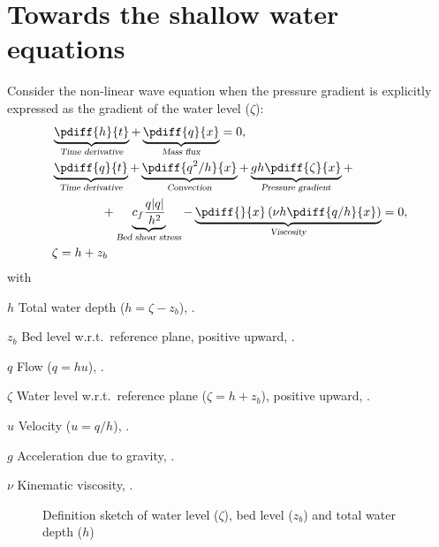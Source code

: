 \chapter{Towards the shallow water equations}\label{sec:1d_swe}
Consider the non-linear wave equation when the pressure gradient is explicitly expressed as the gradient of the water level ($\zeta$):
\begin{subequations}
    \begin{align}
        &\underbrace{\pdiff{h}{t}}_{\textsl{Time derivative}}  +
        \underbrace{\pdiff{q}{x}}_{\textsl{Mass flux}} =0,
        \\
        &\underbrace{\pdiff{q}{t}}_{\textsl{Time derivative}}  +
        \underbrace{\pdiff{q^2/h}{x}}_{\textsl{Convection}} +
        \underbrace{gh \pdiff{\zeta}{x}}_{\textsl{Pressure gradient}} +
        \nonumber \\*
        & \qquad \qquad +
        \underbrace{c_f\frac{q\abs{q}}{h^2}}_{\textsl{Bed shear stress}}
        -\underbrace{\pdiff{}{x}\left( \nu h \pdiff{q/h}{x}\right)}_{\textsl{Viscosity}} = 0,
        \\
        &\zeta = h + z_b
    \end{align}
    \label{eq:1d_non_linear_wave2}
\end{subequations}
%
with
\begin{symbollist}
    \item[$h$] Total water depth ($h = \zeta - z_b$), \bunit{\metre}.
    \item[$z_b$] Bed level w.r.t.\ reference plane, positive upward, \bunit{\metre}.
    \item[$q$] Flow ($q = hu$), \bunit{\square\metre\per\second}.
    \item[$\zeta$] Water level w.r.t.\ reference plane ($\zeta = h + z_b$), positive upward, \bunit{\metre}.
    \item[$u$] Velocity ($u = q/h$), \bunit{\metre\per\second}.
    \item[$g$] Acceleration due to gravity, \bunit{\metre\per\square\second}.
    \item[$\nu$] Kinematic viscosity, \bunit{\square\metre\per\second}.
\end{symbollist}
\vspace{1cm}
\begin{figure}[H]
    \centering
    \begin{center}
        \def\svgwidth{1.0\textwidth} %
        \resizebox{0.9\textwidth}{!}{
            
        }
    \end{center}
    \caption{Definition sketch of water level ($\zeta$), bed level ($z_b$) and total water depth ($h$)}\label{fig:definition_variables_1d}
\end{figure}
